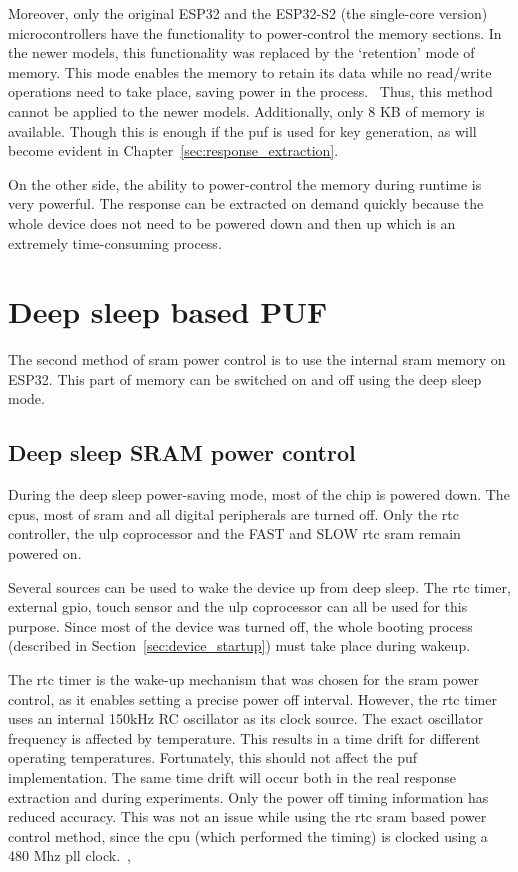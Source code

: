 Moreover, only the original ESP32 and the ESP32-S2 (the single-core version) microcontrollers have the functionality to power-control the memory sections. In the newer models, this functionality was replaced by the `retention' mode of memory. This mode enables the memory to retain its data while no read/write operations need to take place, saving power in the process.~\cite{esp322021} Thus, this method cannot be applied to the newer models. Additionally, only 8 KB of memory is available. Though this is enough if the \gls{puf} is used for key generation, as will become evident in Chapter~\ref{sec:response_extraction}.

On the other side, the ability to power-control the memory during runtime is very powerful. The response can be extracted on demand quickly because the whole device does not need to be powered down and then up which is an extremely time-consuming process.

\section{Deep sleep based PUF}

The second method of \gls{sram} power control is to use the internal \gls{sram} memory on ESP32. This part of memory can be switched on and off using the deep sleep mode.

\subsection{Deep sleep SRAM power control}

During the deep sleep power-saving mode, most of the chip is powered down. The \glspl{cpu}, most of \gls{sram} and all digital peripherals are turned off. Only the \gls{rtc} controller, the \gls{ulp} coprocessor and the FAST and SLOW \gls{rtc} \gls{sram} remain powered on. 

Several sources can be used to wake the device up from deep sleep. The \gls{rtc} timer, external \gls{gpio}, touch sensor and the \gls{ulp} coprocessor can all be used for this purpose. Since most of the device was turned off, the whole booting process (described in Section~\ref{sec:device_startup}) must take place during wakeup.

The \gls{rtc} timer is the wake-up mechanism that was chosen for the \gls{sram} power control, as it enables setting a precise power off interval. However, the \gls{rtc} timer uses an internal 150kHz RC oscillator as its clock source. The exact oscillator frequency is affected by temperature. This results in a time drift for different operating temperatures. Fortunately, this should not affect the \gls{puf} implementation. The same time drift will occur both in the real response extraction and during experiments. Only the power off timing information has reduced accuracy. This was not an issue while using the \gls{rtc} \gls{sram} based power control method, since the \gls{cpu} (which performed the timing) is clocked using  a 480 Mhz \gls{pll} clock.~\cite{esp322021},~\cite{espidf2022}

